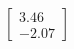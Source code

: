 \documentclass[preview]{standalone}
\begin{document}
\begin{align*}
\begin{bmatrix} 3.46 \\ -2.07 \end{bmatrix}
\end{align*}
\end{document}

